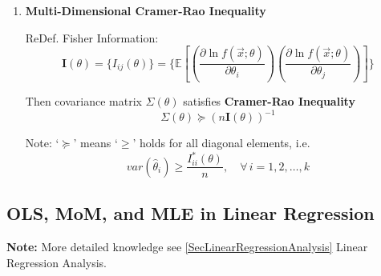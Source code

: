 \begin{enumerate}[topsep=2pt,itemsep=0pt]
        Special case: $g(\theta)=\theta$ then
        \begin{equation}
            var(\hat{\theta})\geq\frac{1}{nI(\theta)}    
        \end{equation}

        note:
        \begin{itemize}
            \item C-R Inequality determine a lower bound, not the infimum(i.e. UMVUE$\nRightarrow var(\hat{g}(\vec{X}))=\dfrac{[g'(\theta)]^2}{nI(\theta)}$).
            \item Take '=': Only some cases in Exponential family.
            \item \textbf{Efficiency} $ e_{\hat{g}} $: How good the estimator is.
            \begin{equation}
                e_{\hat{g}(\vec{X})}(\theta)=   \frac{[g'(\theta)]^2/(nI(\theta))}{var(\hat{g}(\vec{X}))} 
            \end{equation} 
        \end{itemize}


    \item \textbf{Multi-Dimensional Cramer-Rao Inequality}
    
        ReDef. Fisher Information:
        \begin{equation}
            \bm{I}(\theta)=\{I_{ij}(\theta)\}=\{\mathbb{E}\left[\left(\frac{\partial\ln f(\vec{x};\theta)}{\partial\theta_i}\right)\left(\frac{\partial\ln f(\vec{x};\theta)}{\partial\theta_j}\right)\right]\}  
        \end{equation}

        Then covariance matrix $\Sigma(\theta)$ satisfies \textbf{Cramer-Rao Inequality}
        \begin{equation}
            \Sigma(\theta)\succeq  (n\bm{I}(\theta))^{-1}
        \end{equation}

        Note: `$\succeq $' means `$ \geq $' holds for all diagonal elements, i.e.
    \begin{equation}
        var(\hat{\theta}_i)\geq \frac{I^*_{ii}(\theta)}{n},\quad \forall\,i=1,2,\ldots,k  
    \end{equation}


        
    \end{enumerate}






\subsection{OLS, MoM, and MLE in Linear Regression}\label{SubSectionMoM_MLE_LinearRegression}
    \textbf{Note:} More detailed knowledge see \autoref{SecLinearRegressionAnalysis} Linear Regression Analysis.

